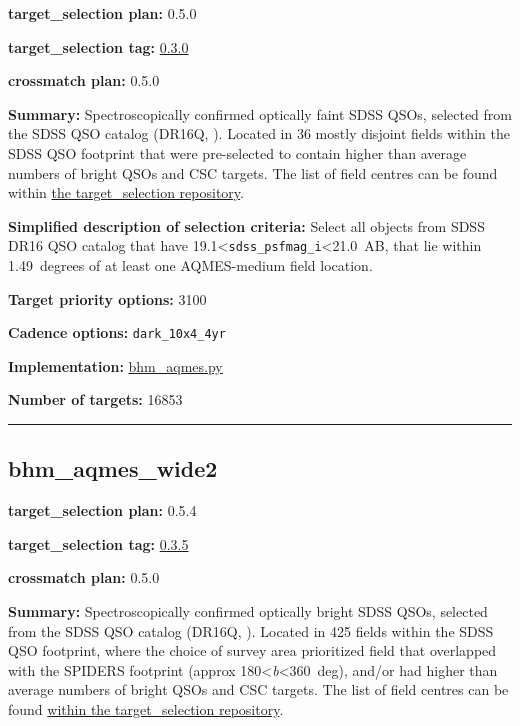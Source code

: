 \noindent\textbf{target\_selection plan:} 0.5.0

\noindent\textbf{target\_selection tag:}
\href{https://github.com/sdss/target_selection/tree/0.3.0/}{0.3.0}

\noindent\textbf{crossmatch plan:} 0.5.0

\noindent\textbf{Summary:} Spectroscopically confirmed optically faint SDSS QSOs,
selected from the SDSS QSO catalog (DR16Q,
\citealt{Lyke2020}). Located in 36 mostly disjoint fields within the SDSS QSO
footprint that were pre-selected to contain higher than average numbers
of bright QSOs and CSC targets. The list of field centres can be found
within
\href{https://github.com/sdss/target_selection/blob/0.3.0/python/target_selection/masks/candidate_target_fields_bhm_aqmes_med_v0.3.1.fits}{the
target\_selection repository}.

\noindent\textbf{Simplified description of selection criteria:} Select all
objects from SDSS DR16 QSO catalog that have
19.1\textless{}\texttt{sdss\_psfmag\_i}\textless21.0~AB, that lie within
1.49~degrees of at least one AQMES-medium field location.


\noindent\textbf{Target priority options:} 3100

\noindent\textbf{Cadence options:} \texttt{dark\_10x4\_4yr}

\noindent\textbf{Implementation:}
\href{https://github.com/sdss/target_selection/blob/0.3.0/python/target_selection/cartons/bhm_aqmes.py}{bhm\_aqmes.py}

\noindent\textbf{Number of targets:} 16853

\begin{center}\rule{0.5\linewidth}{0.5pt}\end{center}

\hypertarget{bhm_aqmes_wide2_plan0.5.4}{%
\subsection{bhm\_aqmes\_wide2}\label{bhm_aqmes_wide2_plan0.5.4}}

\noindent\textbf{target\_selection plan:} 0.5.4

\noindent\textbf{target\_selection tag:}
\href{https://github.com/sdss/target_selection/tree/0.3.5/}{0.3.5}

\noindent\textbf{crossmatch plan:} 0.5.0

\noindent\textbf{Summary:} Spectroscopically confirmed optically bright SDSS
QSOs, selected from the SDSS QSO catalog (DR16Q,
\citealt{Lyke2020}). Located in 425 fields within the SDSS QSO footprint,
where the choice of survey area prioritized field that overlapped with
the SPIDERS footprint (approx 180\textless{}\emph{b}\textless360~deg),
and/or had higher than average numbers of bright QSOs and CSC targets.
The list of field centres can be found
\href{https://github.com/sdss/target_selection/blob/0.3.0/python/target_selection/masks/candidate_target_fields_bhm_aqmes_wide_v0.3.1.fits}{within
the target\_selection repository}.

